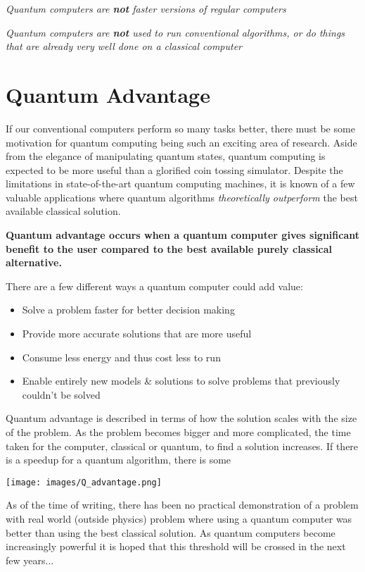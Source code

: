 \documentclass{book}
\begin{document}
\emph{Quantum computers are \textbf{not} faster versions of regular computers}

\emph{ Quantum computers are \textbf{not} used to run conventional algorithms, or do things that are already very well done on a classical computer }

\section{Quantum Advantage} 

If our conventional computers perform so many tasks better, there must be some motivation for quantum computing being such an exciting area of research. Aside from the elegance of manipulating quantum states, quantum computing is expected to be more useful than a glorified coin tossing simulator. Despite the limitations in state-of-the-art quantum computing machines, it is known of a few valuable applications where quantum algorithms \textit{theoretically outperform} the best available classical solution.

\textbf{Quantum advantage occurs when a quantum computer gives significant benefit to the user compared to the best available purely classical alternative.} 

There are a few different ways a quantum computer could add value: 

\begin{itemize}
    \item Solve a problem faster for better decision making
    \item Provide more accurate solutions that are more useful 
    \item Consume less energy and thus cost less to run 
    \item Enable entirely new models \& solutions to solve problems that previously couldn't be solved
\end{itemize}

    
Quantum advantage is described in terms of how the solution scales with the size of the problem. As the problem becomes bigger and more complicated, the time taken for the computer, classical or quantum, to find a solution increases. If there is a speedup for a quantum algorithm, there is some 

\texttt{[image: images/Q\_advantage.png]}

As of the time of writing, there has been no practical demonstration of a problem with real world (outside physics) problem where using a quantum computer was better than using the best classical solution. As quantum computers become increasingly powerful it is hoped that this threshold will be crossed in the next few years...
\end{document}
